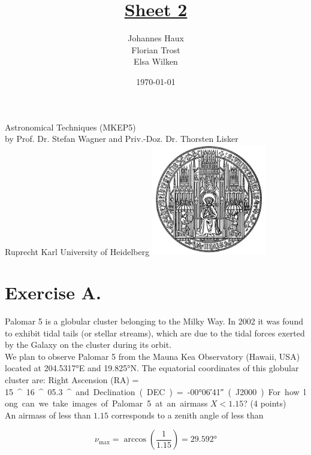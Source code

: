\documentclass[11pt,a4paper,twoside]{article}
\title{\LARGE \underline {Sheet 2}}
\author{Johannes Haux \\ Florian Trost \\ Elsa Wilken}
\date{\today}
\begin{document}
\maketitle
\thispagestyle{empty}

\begin{center}
  Astronomical Techniques (MKEP5) \\
  \baselineskip35pt
  by Prof. Dr. Stefan Wagner and Priv.-Doz. Dr. Thorsten Lisker \\
  \baselineskip60pt
  Ruprecht Karl University of Heidelberg
\vskip 40pt
\includegraphics[width=5cm]{pic/UniHD.png}

\end{center}

\newpage
\setcounter{page}{1}		%

\section*{Exercise A.} 

Palomar 5 is a globular cluster belonging to the Milky Way. In 2002 it was 
found to exhibit tidal tails (or stellar streams), which are due to the tidal 
forces exerted by the Galaxy on the cluster during its orbit. \\

We plan to observe Palomar 5 from the Mauna Kea Observatory (Hawaii, USA) 
located at \ang{204.5317}E and \ang{19.825}N. The equatorial coordinates of 
this globular cluster are: Right Ascension (RA) = \SI{15}{^\hour} 
\SI{16}{^\minute} \SI{05.3}{^\second} and Declination (DEC) = 
\ang{-00;06;41} (J2000).
For how long can we take images of Palomar 5 at an airmass $X < 1.15$? 
(4 points) \\

An airmass of less than $1.15$ corresponds to a zenith angle of less than 

\begin{equation}
 \nu_{\text{max}} = \arccos{\left( \frac{1}{1.15} \right)} = \ang{29.592}
\end{equation}
\end{document}
